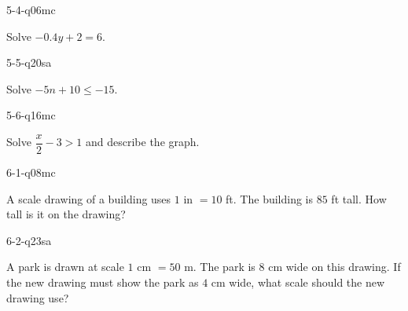 \begin{practiceQuestion}{5-4-q06}{mc}
\begin{questionText}
Solve $-0.4y + 2 = 6$.
\end{questionText}
\end{practiceQuestion}

\begin{practiceQuestion}{5-5-q20}{sa}
\begin{questionText}
Solve $-5n + 10 \leq -15$.
\end{questionText}
\end{practiceQuestion}

\begin{practiceQuestion}{5-6-q16}{mc}
\begin{questionText}
Solve $\dfrac{x}{2} - 3 > 1$ and describe the graph.
\end{questionText}
\end{practiceQuestion}

\begin{practiceQuestion}{6-1-q08}{mc}
\begin{questionText}
A scale drawing of a building uses $1$ in $= 10$ ft. The building is $85$ ft tall. How tall is it on the drawing?
\end{questionText}
\end{practiceQuestion}

\begin{practiceQuestion}{6-2-q23}{sa}
\begin{questionText}
A park is drawn at scale $1$ cm $= 50$ m. The park is $8$ cm wide on this drawing. If the new drawing must show the park as $4$ cm wide, what scale should the new drawing use?
\end{questionText}
\end{practiceQuestion}


